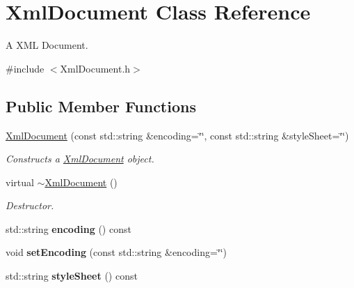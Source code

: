 \hypertarget{class_xml_document}{}\section{Xml\+Document Class Reference}
\label{class_xml_document}


A X\+ML Document.  




{\ttfamily \#include $<$Xml\+Document.\+h$>$}

\subsection*{Public Member Functions}
\begin{DoxyCompactItemize}
\item 
\hyperlink{class_xml_document_a3bc4c5ea5f22b4ff8776422125b31d42}{Xml\+Document} (const std\+::string \&encoding=\char`\"{}\char`\"{}, const std\+::string \&style\+Sheet=\char`\"{}\char`\"{})
\begin{DoxyCompactList}\small\item\em Constructs a \hyperlink{class_xml_document}{Xml\+Document} object. \end{DoxyCompactList}\item 
virtual \hyperlink{class_xml_document_a5c95c959091f1ae826b8698ba0c3416c}{$\sim$\+Xml\+Document} ()\hypertarget{class_xml_document_a5c95c959091f1ae826b8698ba0c3416c}{}\label{class_xml_document_a5c95c959091f1ae826b8698ba0c3416c}

\begin{DoxyCompactList}\small\item\em Destructor. \end{DoxyCompactList}\item 
std\+::string {\bfseries encoding} () const \hypertarget{class_xml_document_a5063b9dc310ed5ed7a38b77f8584a50c}{}\label{class_xml_document_a5063b9dc310ed5ed7a38b77f8584a50c}

\item 
void {\bfseries set\+Encoding} (const std\+::string \&encoding=\char`\"{}\char`\"{})\hypertarget{class_xml_document_afb4401e77f67626533ba7409a011c508}{}\label{class_xml_document_afb4401e77f67626533ba7409a011c508}

\item 
std\+::string {\bfseries style\+Sheet} () const \hypertarget{class_xml_document_ae0a7e5e1f28b179c31bee66481b18c03}{}\label{class_xml_document_ae0a7e5e1f28b179c31bee66481b18c03}


\end{DoxyCompactItemize}
